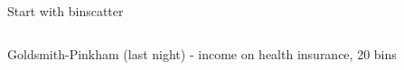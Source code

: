 \documentclass[notes,11pt, aspectratio=169]{beamer}
\begin{document}
\begin{frame}{Start with binscatter}
\begin{columns}[T]
\begin{column}{.5\textwidth}
{    Goldsmith-Pinkham (last night) - income on health insurance, 20 bins            
      }
  \end{column}
\end{columns}
\end{frame}
\end{document}
